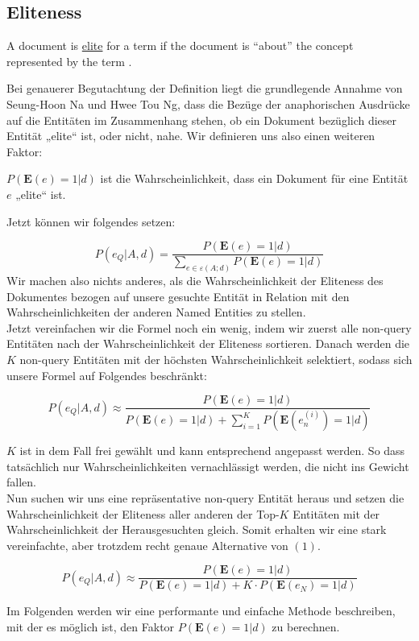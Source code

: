 \subsection{Eliteness}

\begin{defi}
	A document is \underline{elite} for a term if the document is ``about'' the concept represented by the term \cite{paper:Robertson}.
\end{defi}


Bei genauerer Begutachtung der Definition liegt die grundlegende Annahme von Seung-Hoon Na und Hwee Tou Ng, dass die Bezüge der anaphorischen Ausdrücke auf die Entitäten im Zusammenhang stehen, ob ein Dokument bezüglich dieser Entität „elite“ ist, oder nicht, nahe. Wir definieren uns also einen weiteren Faktor:

\begin{defi}
$P(\textbf{E}(e) = 1 | d)$ ist die Wahrscheinlichkeit, dass ein Dokument für eine Entität $e$ „elite“ ist.
\end{defi}

Jetzt können wir folgendes setzen:

\begin{equation}
P(e_Q | A,d) = \frac{P(\textbf{E}(e) = 1 | d)}{\sum_{e \in \varepsilon (A;d)} P(\textbf{E}(e) = 1 | d)}
\end{equation}
Wir machen also nichts anderes, als die Wahrscheinlichkeit der Eliteness des Dokumentes bezogen auf unsere gesuchte Entität in Relation mit den Wahrscheinlichkeiten der anderen Named Entities zu stellen.\\
Jetzt vereinfachen wir die Formel noch ein wenig, indem wir zuerst alle non-query Entitäten nach der Wahrscheinlichkeit der Eliteness sortieren. Danach werden die $K$ non-query Entitäten mit der höchsten Wahrscheinlichkeit selektiert, sodass sich unsere Formel auf Folgendes beschränkt:

\[ P(e_Q | A,d) \approx \frac{P(\textbf{E}(e) = 1 | d)}{P(\textbf{E}(e) = 1 | d) + \sum_{i=1}^{K} P(\textbf{E}(e_{n}^{(i)}) = 1 | d)} \]

$K$ ist in dem Fall frei gewählt und kann entsprechend angepasst werden. So dass tatsächlich nur Wahrscheinlichkeiten vernachlässigt werden, die nicht ins Gewicht fallen.\\
Nun suchen wir uns eine repräsentative non-query Entität heraus und setzen die Wahrscheinlichkeit der Eliteness aller anderen der Top-$K$ Entitäten mit der Wahrscheinlichkeit der Herausgesuchten gleich. Somit erhalten wir eine stark vereinfachte, aber trotzdem recht genaue Alternative von $(1)$.

\[ P(e_Q | A,d) \approx \frac{P(\textbf{E}(e) = 1 | d)}{P(\textbf{E}(e) = 1 | d) + K \cdot P(\textbf{E}(e_N) = 1 | d)} \]


Im Folgenden werden wir eine performante und einfache Methode beschreiben, mit der es möglich ist, den Faktor $P(\textbf{E}(e) = 1 | d)$ zu berechnen.

